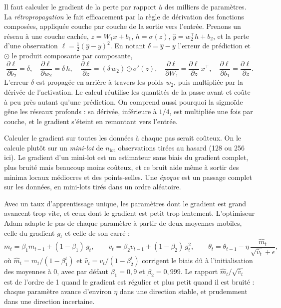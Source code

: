 \documentclass[11pt,a4paper]{article}
\begin{document}
Il faut calculer le gradient de la perte par rapport à des milliers de paramètres. La \emph{rétropropagation} le fait
efficacement par la règle de dérivation des fonctions composées, appliquée couche par couche de la sortie vers
l'entrée. Prenons un réseau à une couche cachée, $z = W_1 x + b_1$, $h = \sigma(z)$, $\hat y = w_2^\top h + b_2$, et
la perte d'une observation $\ell = \frac12(\hat y - y)^2$. En notant $\delta = \hat y - y$ l'erreur de prédiction et
$\odot$ le produit composante par composante,
\[
\frac{\partial \ell}{\partial b_2} = \delta, \quad
\frac{\partial \ell}{\partial w_2} = \delta\,h, \quad
\frac{\partial \ell}{\partial z} = (\delta\,w_2) \odot \sigma'(z), \quad
\frac{\partial \ell}{\partial W_1} = \frac{\partial \ell}{\partial z}\,x^\top, \quad
\frac{\partial \ell}{\partial b_1} = \frac{\partial \ell}{\partial z} .
\]
L'erreur $\delta$ est propagée en arrière à travers les poids $w_2$, puis multipliée par la dérivée de l'activation.
Le calcul réutilise les quantités de la passe avant et coûte à peu près autant qu'une prédiction. On comprend aussi
pourquoi la sigmoïde gêne les réseaux profonds : sa dérivée, inférieure à $1/4$, est multipliée une fois par couche, et
le gradient s'éteint en remontant vers l'entrée.

Calculer le gradient sur toutes les données à chaque pas serait coûteux. On le calcule plutôt sur un \emph{mini-lot}
de $n_{\text{lot}}$ observations tirées au hasard (128 ou 256 ici). Le gradient d'un mini-lot est un estimateur sans
biais du gradient complet, plus bruité mais beaucoup moins coûteux, et ce bruit aide même à sortir des minima locaux
médiocres et des points-selles. Une \emph{époque} est un passage complet sur les données, en mini-lots tirés dans un
ordre aléatoire.

Avec un taux d'apprentissage unique, les paramètres dont le gradient est grand avancent trop vite, et ceux dont le
gradient est petit trop lentement. L'optimiseur Adam \citep{kingma2015} adapte le pas de chaque paramètre à partir de
deux moyennes mobiles, celle du gradient $g_t$ et celle de son carré :
\[
m_t = \beta_1 m_{t-1} + (1 - \beta_1)\,g_t, \qquad v_t = \beta_2 v_{t-1} + (1 - \beta_2)\,g_t^2, \qquad
\theta_t = \theta_{t-1} - \eta\,\frac{\hat m_t}{\sqrt{\hat v_t} + \epsilon},
\]
où $\hat m_t = m_t/(1 - \beta_1^t)$ et $\hat v_t = v_t/(1 - \beta_2^t)$ corrigent le biais dû à l'initialisation des
moyennes à 0, avec par défaut $\beta_1 = 0{,}9$ et $\beta_2 = 0{,}999$. Le rapport $\hat m_t/\sqrt{\hat v_t}$ est de
l'ordre de 1 quand le gradient est régulier et plus petit quand il est bruité : chaque paramètre avance d'environ
$\eta$ dans une direction stable, et prudemment dans une direction incertaine.
\end{document}
